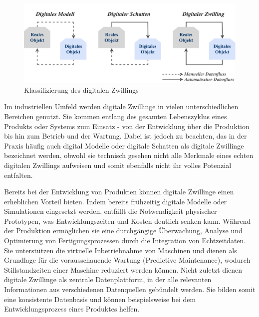 \vspace{-0.5em}
\begin{figure}[htbp]
    \centering
    \includegraphics[width=1\textwidth]{Bilder/klassifizierung_DT.pdf}
    \caption{Klassifizierung des digitalen Zwillings}
    \label{fig:klassifizierungDT}
\end{figure}

Im industriellen Umfeld werden digitale Zwillinge in vielen unterschiedlichen Bereichen genutzt.
Sie kommen entlang des gesamten Lebenszyklus eines Produkts oder Systems zum Einsatz - von der Entwicklung über die Produktion bis hin zum Betrieb und der Wartung. 
Dabei ist jedoch zu beachten, das in der Praxis häufig auch digital Modelle oder digitale Schatten als digitale Zwillinge bezeichnet werden, obwohl sie technisch gesehen nicht alle Merkmale eines echten digitalen Zwillings aufweisen und somit ebenfalls nicht ihr volles Potenzial entfalten.

Bereits bei der Entwicklung von Produkten können digitale Zwillinge einen erheblichen Vorteil bieten. 
Indem bereits frühzeitig digitale Modelle oder Simulationen eingesetzt werden, entfällt die Notwendigkeit physischer Prototypen, was Entwicklungszeiten und Kosten deutlich senken kann. Während der Produktion ermöglichen sie eine durchgängige Überwachung, Analyse und Optimierung von Fertigungsprozessen durch die Integration von Echtzeitdaten.
Sie unterstützen die virtuelle Inbetriebnahme von Maschinen und dienen als Grundlage für die vorausschauende Wartung (Predictive Maintenance), wodurch Stillstandzeiten einer Maschine reduziert werden können.
Nicht zuletzt dienen digitale Zwillinge als zentrale Datenplattform, in der alle relevanten Informationen aus verschiedenen Datenquellen gebündelt werden.
Sie bilden somit eine konsistente Datenbasis und können beispielsweise bei dem Entwicklungsprozess eines Produktes helfen. \cite{DTForSmartManufacturing}

